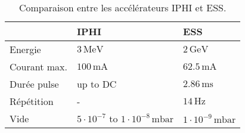 \begin{table}[!h]
  \centering
  \caption[]{Comparaison entre les accélérateurs IPHI et ESS.}
  \label{sumfr:tab:IPHI_carac}
  \begin{tabularx}{\linewidth}{XXX}
    \toprule
                 & IPHI                                              & ESS                            \\
    \midrule
    Energie      & $3\,\mathrm{MeV}$                                 & $2\,\mathrm{GeV}$              \\
    Courant max. & $100\,\mathrm{mA}$                                & $62.5\,\mathrm{mA}$            \\
    Durée pulse  & up to DC                                          & $2.86\,\mathrm{ms}$            \\
    Répétition   & -                                                 & $14\,\mathrm{Hz}$              \\
    Vide         & $5\cdot10^{-7}$ to $1\cdot10^{-8}\,\mathrm{mbar}$ & $1\cdot10^{-9}\,\mathrm{mbar}$ \\
    \bottomrule
  \end{tabularx}
\end{table}